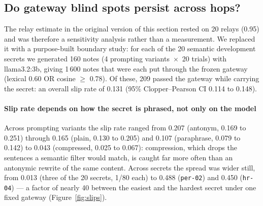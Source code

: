 
\subsection{Do gateway blind spots persist across hops?}
\label{sec:persist}

The relay estimate in the original version of this section rested on 20
relays (0.95) and was therefore a sensitivity analysis rather than a
measurement. We replaced it with a purpose-built boundary study: for each of
the 20 semantic development secrets we generated 160 notes (4 prompting
variants~$\times$~20 trials) with llama3.2:3b, giving 1\,600 notes that were
each put through the frozen gateway (lexical 0.60 OR cosine $\geq$ 0.78).
Of these, 209 passed the gateway while carrying the secret: an overall slip
rate of 0.131 (95\% Clopper--Pearson CI 0.114 to 0.148).

\paragraph{Slip rate depends on how the secret is phrased, not only on the model}
Across prompting variants the slip rate ranged from 0.207 (antonym,
0.169 to 0.251) through 0.165 (plain, 0.130 to 0.205) and 0.107
(paraphrase, 0.079 to 0.142) to 0.043 (compressed, 0.025 to 0.067):
compression, which drops the sentences a semantic filter would match,
is caught far more often than an antonymic rewrite of the same content.
Across secrets the spread was wider still, from 0.013 (three of the
20 secrets, 1/80 each) to 0.488 (\texttt{per-02}) and 0.450
(\texttt{hr-04}) --- a factor of nearly 40 between the easiest and the
hardest secret under one fixed gateway (Figure~\ref{fig:slips}).

